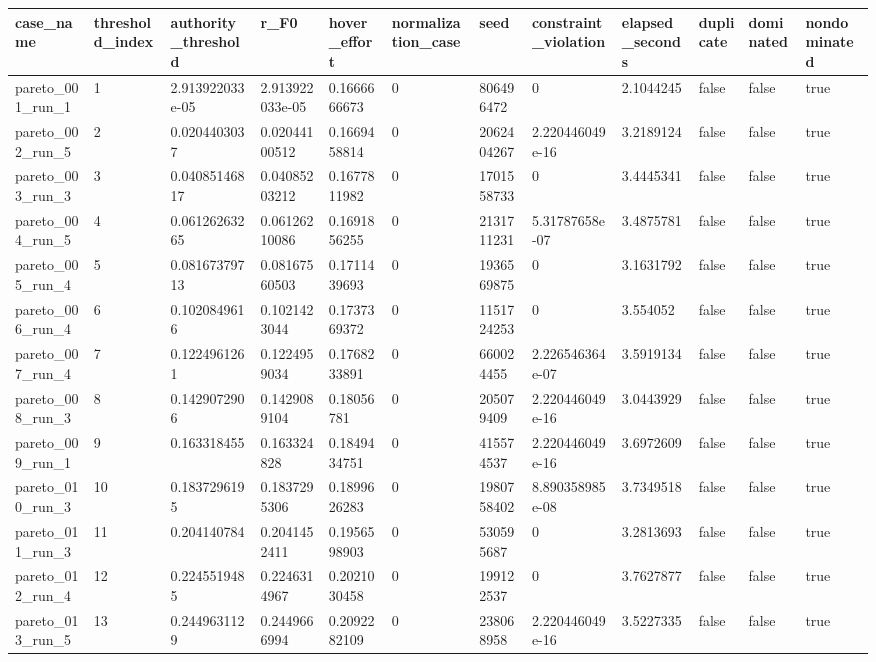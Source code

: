 \begin{tabular}{@{}llllllllllll@{}}
\toprule
case\_name & threshold\_index & authority\_threshold & r\_F0 & hover\_effort & normalization\_case & seed & constraint\_violation & elapsed\_seconds & duplicate & dominated & nondominated \\
\midrule
pareto\_001\_run\_1 & 1 & 2.913922033e-05 & 2.913922033e-05 & 0.1666666673 & 0 & 806496472 & 0 & 2.1044245 & false & false & true \\
pareto\_002\_run\_5 & 2 & 0.0204403037 & 0.02044100512 & 0.1669458814 & 0 & 2062404267 & 2.220446049e-16 & 3.2189124 & false & false & true \\
pareto\_003\_run\_3 & 3 & 0.04085146817 & 0.04085203212 & 0.1677811982 & 0 & 1701558733 & 0 & 3.4445341 & false & false & true \\
pareto\_004\_run\_5 & 4 & 0.06126263265 & 0.06126210086 & 0.1691856255 & 0 & 2131711231 & 5.31787658e-07 & 3.4875781 & false & false & true \\
pareto\_005\_run\_4 & 5 & 0.08167379713 & 0.08167560503 & 0.1711439693 & 0 & 1936569875 & 0 & 3.1631792 & false & false & true \\
pareto\_006\_run\_4 & 6 & 0.1020849616 & 0.1021423044 & 0.1737369372 & 0 & 1151724253 & 0 & 3.554052 & false & false & true \\
pareto\_007\_run\_4 & 7 & 0.1224961261 & 0.1224959034 & 0.1768233891 & 0 & 660024455 & 2.226546364e-07 & 3.5919134 & false & false & true \\
pareto\_008\_run\_3 & 8 & 0.1429072906 & 0.1429089104 & 0.18056781 & 0 & 205079409 & 2.220446049e-16 & 3.0443929 & false & false & true \\
pareto\_009\_run\_1 & 9 & 0.163318455 & 0.163324828 & 0.1849434751 & 0 & 415574537 & 2.220446049e-16 & 3.6972609 & false & false & true \\
pareto\_010\_run\_3 & 10 & 0.1837296195 & 0.1837295306 & 0.1899626283 & 0 & 1980758402 & 8.890358985e-08 & 3.7349518 & false & false & true \\
pareto\_011\_run\_3 & 11 & 0.204140784 & 0.2041452411 & 0.1956598903 & 0 & 530595687 & 0 & 3.2813693 & false & false & true \\
pareto\_012\_run\_4 & 12 & 0.2245519485 & 0.2246314967 & 0.2021030458 & 0 & 199122537 & 0 & 3.7627877 & false & false & true \\
pareto\_013\_run\_5 & 13 & 0.2449631129 & 0.2449666994 & 0.2092282109 & 0 & 238068958 & 2.220446049e-16 & 3.5227335 & false & false & true \\

\end{tabular}
